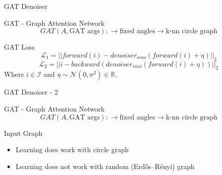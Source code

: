 \documentclass[aspectratio=169]{beamer}
\begin{document}
\begin{frame}{GAT Denoiser}
    \begin{block}{GAT - Graph Attention Network}
        $$ GAT (A, \text{GAT args}) : \to \text{fixed angles} \to \text{k-nn circle graph} $$
    \end{block}    
    
    \pause

    \begin{block}{GAT Loss}
        $$ \mathcal{L}_1 = || forward(i) - denoiser_{sino}(forward(i) + \eta) ||_2 $$ 
        $$ \mathcal{L}_2 = || i - backward (denoiser_{sino}(forward(i) + \eta)) ||_2 $$ 
        \center
        Where $i \in \mathcal{I}$ and $\eta \sim \mathcal{N}(0,\sigma^2) \in \mathbb{R}$.
    \end{block}

\end{frame}

\begin{frame}{GAT Denoiser - 2}
    \begin{block}{GAT - Graph Attention Network}
        $$ GAT (A, \text{GAT args}) : \to \text{fixed angles} \to \text{k-nn circle graph} $$
    \end{block}    

    \begin{alertblock}{Input Graph}
        \begin{itemize}
            \item Learning does work with circle graph
            \item Learning does not work with random (Erdős–Rényi) graph
        \end{itemize}
    \end{alertblock}

\end{frame}
\end{document}

